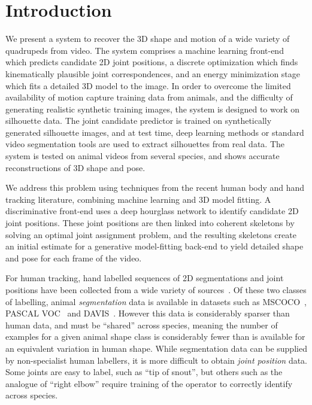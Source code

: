 \section{Introduction}
We present a system to recover the 3D shape and motion of a wide variety of quadrupeds from video.  The system comprises a machine learning front-end which predicts candidate 2D joint positions, a discrete optimization which finds kinematically plausible joint correspondences, 
and an energy minimization stage which fits a detailed 3D model to the image. In order to overcome the limited availability of motion capture training data from animals, and the difficulty of generating realistic synthetic training images, the system is designed to work on silhouette data.  The joint candidate predictor is trained on synthetically generated silhouette images, and at test time, deep learning methods or standard video segmentation tools are used to extract silhouettes from real data. The system is tested on animal videos from several species, and shows accurate reconstructions of 3D shape and pose.

We address this problem using techniques from the recent human body and hand tracking literature, combining machine learning and 3D model fitting.  A discriminative front-end uses a deep hourglass network to identify candidate 2D joint positions. These joint positions are then linked into coherent skeletons by solving an optimal joint assignment problem, and the resulting skeletons create an initial estimate for a generative model-fitting back-end to yield detailed shape and pose for each frame of the video.  

For human tracking, hand labelled sequences of 2D segmentations and joint positions have been collected from a wide variety of sources~\cite{andriluka14cvpr,lin2014microsoft,johnson2010clustered}. Of these two classes of labelling, animal {\em segmentation} data is available in datasets such as MSCOCO~\cite{lin2014microsoft}, PASCAL VOC~\cite{everingham2010pascal} and DAVIS~\cite{Perazzi2016}.  However this data is considerably sparser than human data, and must be ``shared'' across species, meaning the number of examples for a given animal shape class is considerably fewer than is available for an equivalent variation in human shape.  While segmentation data can be supplied by non-specialist human labellers, it is more difficult to obtain {\em joint position} data.  Some joints are easy to label, such as ``tip of snout'', but others such as the analogue of ``right elbow'' require training of the operator to correctly identify across species.

